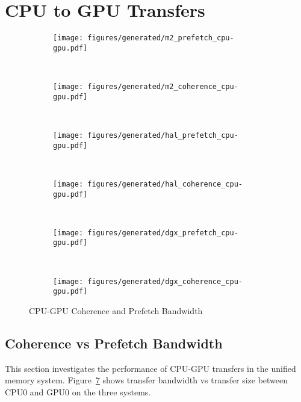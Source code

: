 \section{CPU to GPU Transfers}
\label{sec:um-cpu-gpu}


\begin{figure}[ht]
    \centering
    \begin{subfigure}[b]{0.45\textwidth}
        \texttt{[image: figures/generated/m2\_prefetch\_cpu-gpu.pdf]}
        \caption{}
        \label{fig:um-prefetch-s822lc-cpu-gpu}
    \end{subfigure}
    ~
    \begin{subfigure}[b]{0.45\textwidth}
        \texttt{[image: figures/generated/m2\_coherence\_cpu-gpu.pdf]}
        \caption{}
        \label{fig:um-coherence-s822lc-cpu-gpu}
    \end{subfigure}
    \\
    \begin{subfigure}[b]{0.45\textwidth}
        \texttt{[image: figures/generated/hal\_prefetch\_cpu-gpu.pdf]}
        \caption{}
        \label{fig:um-prefetch-ac922-cpu-gpu}
    \end{subfigure}
    ~
    \begin{subfigure}[b]{0.45\textwidth}
        \texttt{[image: figures/generated/hal\_coherence\_cpu-gpu.pdf]}
        \caption{}
        \label{fig:um-coherence-ac922-cpu-gpu}
    \end{subfigure}
    \\
    \begin{subfigure}[b]{0.45\textwidth}
        \texttt{[image: figures/generated/dgx\_prefetch\_cpu-gpu.pdf]}
        \caption{}
        \label{}
    \end{subfigure}
    ~
    \begin{subfigure}[b]{0.45\textwidth}
        \texttt{[image: figures/generated/dgx\_coherence\_cpu-gpu.pdf]}
        \caption{}
        \label{}
    \end{subfigure}
    \caption[]{
        CPU-GPU Coherence and Prefetch Bandwidth
    }
    \label{fig:um-cpu-gpu}
\end{figure}



\subsection{Coherence vs Prefetch Bandwidth}
This section investigates the performance of CPU-GPU transfers in the unified memory system.
Figure~\ref{fig:um-cpu-gpu} shows transfer bandwidth vs transfer size between CPU0 and GPU0 on the three systems.

